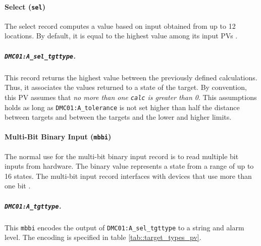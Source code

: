 \paragraph{Select (\texttt{sel})}
\label{par::select}
    The select record computes a value based on input obtained from up to 12 locations.
    By default, it is equal to the highest value among its input PVs \cite{stanley1998}.

    \subparagraph{\texttt{DMC01:A\_sel\_tgttype}.}
        This record returns the highest value between the previously defined calculations.
        Thus, it associates the values returned to a state of the target.
        By convention, this PV assumes that \emph{no more than one \texttt{calc} is greater than 0}.
        This assumptions holds as long as \texttt{DMC01:A\_tolerance} is not set higher than half the distance between targets and between the targets and the lower and higher limits.

\paragraph{Multi-Bit Binary Input (\texttt{mbbi})}
\label{par::multibit_binary_input}
    The normal use for the multi-bit binary input record is to read multiple bit inputs from hardware.
    The binary value represents a state from a range of up to 16 states.
    The multi-bit input record interfaces with devices that use more than one bit \cite{stanley1998}.

    \subparagraph{\texttt{DMC01:A\_tgttype}.}
        This \texttt{mbbi} encodes the output of \texttt{DMC01:A\_sel\_tgttype} to a string and alarm level.
        The encoding is specified in table \ref{tab::target_types_pv}.

